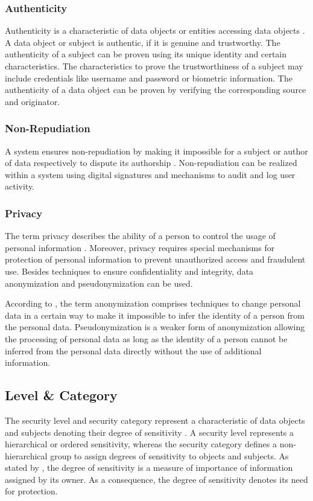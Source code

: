 \subsubsection{Authenticity}
Authenticity is a characteristic of data objects or entities accessing data objects \cite{Eckert2023}.
A data object or subject is authentic, if it is genuine and trustworthy.
The authenticity of a subject can be proven using its unique identity and certain characteristics.
The characteristics to prove the trustworthiness of a subject may include credentials like username and password or biometric information.
The authenticity of a data object can be proven by verifying the corresponding source and originator.

\subsubsection{Non-Repudiation}
A system ensures non-repudiation by making it impossible for a subject or author of data respectively to dispute its authorship \cite{Eckert2023}.
Non-repudiation can be realized within a system using digital signatures and mechanisms to audit and log user activity.

\subsubsection{Privacy}
The term privacy describes the ability of a person to control the usage of personal information \cite{Eckert2023}.
Moreover, privacy requires special mechanisms for protection of personal information to prevent unauthorized access and fraudulent use.
Besides techniques to ensure confidentiality and integrity, data anonymization and pseudonymization can be used.

According to \citeauthor{Eckert2023} \cite{Eckert2023}, the term anonymization comprises techniques to change personal data in a certain way to make it impossible to infer the identity of a person from the personal data.
Pseudonymization is a weaker form of anonymization allowing the processing of personal data as long as the identity of a person cannot be inferred from the personal data directly without the use of additional information.

\subsection{Level \& Category}
The security level and security category represent a characteristic of data objects and subjects denoting their degree of sensitivity \cite{Stine2008}.
A security level represents a hierarchical or ordered sensitivity, whereas the security category defines a non-hierarchical group to assign degrees of sensitivity to objects and subjects.
As stated by \citeauthor{Stine2008} \cite{Stine2008}, the degree of sensitivity is a measure of importance of information assigned by its owner.
As a consequence, the degree of sensitivity denotes its need for protection.

